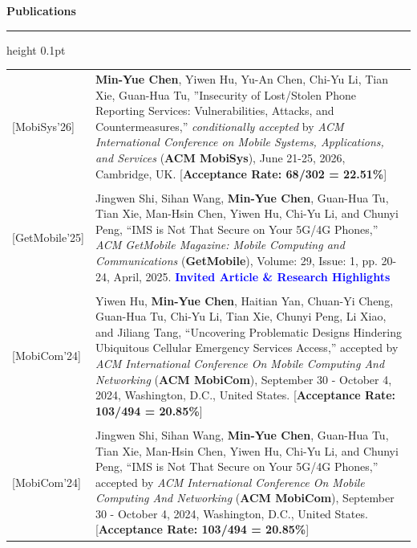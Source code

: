 {\large\bf Publications \bf}
\medskip\hrule height 0.1pt
\vspace{1mm}


\begin{longtable}{p{1mm}p{14.5cm}}

\hspace{-24 mm} [MobiSys'26] 	&\textbf{Min-Yue Chen}, Yiwen Hu, Yu-An Chen, Chi-Yu Li, Tian Xie, Guan-Hua Tu, ''Insecurity of Lost/Stolen Phone Reporting Services: Vulnerabilities, Attacks, and Countermeasures,'' \textit{conditionally accepted} by \emph{ACM International Conference on Mobile Systems, Applications, and Services} (\textbf{ACM MobiSys}), June 21-25, 2026, Cambridge, UK.
[\textbf{Acceptance Rate: 68/302 = 22.51\%}]\\

\\

\hspace{-24 mm} [GetMobile'25] 	&	
Jingwen Shi, Sihan Wang, \textbf{Min-Yue Chen}, Guan-Hua Tu, Tian Xie, Man-Hsin Chen, Yiwen Hu, Chi-Yu Li, and Chunyi Peng,
``IMS is Not That Secure on Your 5G/4G Phones,''
\emph{ACM GetMobile Magazine: Mobile Computing and Communications} (\textbf{GetMobile}), Volume: 29, Issue: 1, pp. 20-24, April, 2025.
\textcolor{Blue}{\textbf{Invited Article \& Research Highlights}} \\

\\


\hspace{-23 mm} [MobiCom'24] 	&	
Yiwen Hu, \textbf{Min-Yue Chen}, Haitian Yan, Chuan-Yi Cheng, Guan-Hua Tu, Chi-Yu Li, Tian Xie, Chunyi Peng, Li Xiao, and Jiliang Tang,
``Uncovering Problematic Designs Hindering Ubiquitous Cellular Emergency Services Access,''
accepted by \emph{ACM International Conference On Mobile Computing And Networking} (\textbf{ACM MobiCom}), September 30 - October 4, 2024, Washington, D.C., United States.
[\textbf{Acceptance Rate: 103/494 = 20.85\%}] \\

\\

\hspace{-23 mm} [MobiCom'24] 	&	
Jingwen Shi, Sihan Wang, \textbf{Min-Yue Chen}, Guan-Hua Tu, Tian Xie, Man-Hsin Chen, Yiwen Hu, Chi-Yu Li, and Chunyi Peng,
``IMS is Not That Secure on Your 5G/4G Phones,''
accepted by \emph{ACM International Conference On Mobile Computing And Networking} (\textbf{ACM MobiCom}), September 30 - October 4, 2024, Washington, D.C., United States.
[\textbf{Acceptance Rate: 103/494 = 20.85\%}]\\


\end{longtable}
